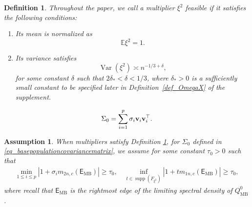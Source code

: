 \documentclass[10pt,a4paper]{amsart}
\newtheorem{definition}{Definition}
\newtheorem{assumption}{Assumption}
\def\bv{\mathbf{v}}
\begin{document}
\begin{definition}\label{defn_feasiblemultiplier}
	\normalfont
	Throughout the paper, we call a multiplier $\xi^2$ \emph{feasible} if it satisfies the following conditions:
	\begin{enumerate}
		\item Its mean is normalized as
		\begin{equation}\label{eq_meancondition}
			\mathbb{E}\xi^2 = 1.
		\end{equation}
		
		\item  Its variance satisfies
		\begin{equation}\label{eq_variancecondition}
			\operatorname{Var}(\xi^2) \asymp n^{-1/3+\delta},
		\end{equation}
		for some constant $\delta$ such that $2\delta_* < \delta < 1/3$, where $\delta_*>0$ is a sufficiently small constant to be specified later in Definition~\ref{def_OmegaX} of the supplement.
	\end{enumerate}
\end{definition}

\begin{equation}\label{eq_basepopulationcovariancematrix}
	\vspace*{-10pt}
	\Sigma_0=\sum_{i=1}^p \sigma_i \bv_i \bv_i^\top. 
\end{equation}

\begin{assumption}\label{assum_technique}
	When multipliers satisfy Definition \ref{defn_feasiblemultiplier}, for $\Sigma_0$ defined in \eqref{eq_basepopulationcovariancematrix}, we assume for some constant $\tau_0>0$ such that 
	\begin{align*}
		\min_{1\le i\le p}|1+\sigma_i m_{2n,c}(\mathsf{E}_{\mathrm{MB}})|\ge\tau_0,\quad \inf_{t\in\operatorname{supp}(F_{\xi^2})}|1+tm_{1n,c}(\mathsf{E}_{\mathrm{MB}})|\ge\tau_0,
	\end{align*}
	where recall that $\mathsf{E}_{\mathrm{MB}}$ is the rightmost edge of the limiting spectral density of $Q_{\mathrm{MB}}^0$.
\end{assumption}
\end{document}
